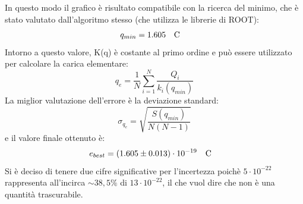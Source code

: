 \documentclass{article}
\begin{document}
    \begin{figure}[H]
    \centering
        \qquad
    \end{figure}

    
    In questo modo il grafico è risultato compatibile con la ricerca del minimo, che è stato valutato dall'algoritmo stesso (che utilizza le librerie di ROOT):
        \[ q_{min} = 1.605 \qq{C}\]
    Intorno a questo valore, K(q) è costante al primo ordine e può essere utilizzato per calcolare la carica elementare:
        \[q_e = \frac{1}{N}\sum_{i=1}^N\frac{Q_i}{k_i(q_{min})}\]
    La miglior valutazione dell'errore è la deviazione standard:
        \[\sigma_{q_e} = \sqrt{\frac{S(q_{min})}{N(N-1)}}\]
    e il valore finale ottenuto è:
          \[ e_{best} = (1.605 \pm 0.013)\cdot 10^{-19} \qq{C}
    \]
    Si è deciso di tenere due cifre significative per l'incertezza poichè $5\cdot10^{-22}$ rappresenta all'incirca $\sim 38,5\%$ di $13\cdot10^{-22}$, il che vuol dire che non è una quantità trascurabile.
    
\newpage
\end{document}
